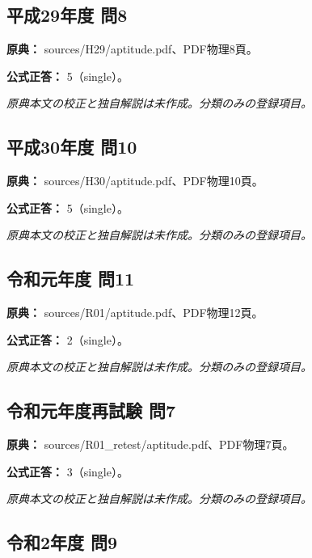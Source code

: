 \subsection{平成29年度 問8}
\label{q:h29-reg-apt-08}

\noindent\textbf{原典：} sources/H29/aptitude.pdf、PDF物理8頁。

\textbf{公式正答：} 5（single）。

\par\textit{原典本文の校正と独自解説は未作成。分類のみの登録項目。}

\subsection{平成30年度 問10}
\label{q:h30-reg-apt-10}

\noindent\textbf{原典：} sources/H30/aptitude.pdf、PDF物理10頁。

\textbf{公式正答：} 5（single）。

\par\textit{原典本文の校正と独自解説は未作成。分類のみの登録項目。}

\subsection{令和元年度 問11}
\label{q:r01-reg-apt-11}

\noindent\textbf{原典：} sources/R01/aptitude.pdf、PDF物理12頁。

\textbf{公式正答：} 2（single）。

\par\textit{原典本文の校正と独自解説は未作成。分類のみの登録項目。}

\subsection{令和元年度再試験 問7}
\label{q:r01-ret-apt-07}

\noindent\textbf{原典：} sources/R01\_retest/aptitude.pdf、PDF物理7頁。

\textbf{公式正答：} 3（single）。

\par\textit{原典本文の校正と独自解説は未作成。分類のみの登録項目。}

\subsection{令和2年度 問9}
\label{q:r02-reg-apt-09}

